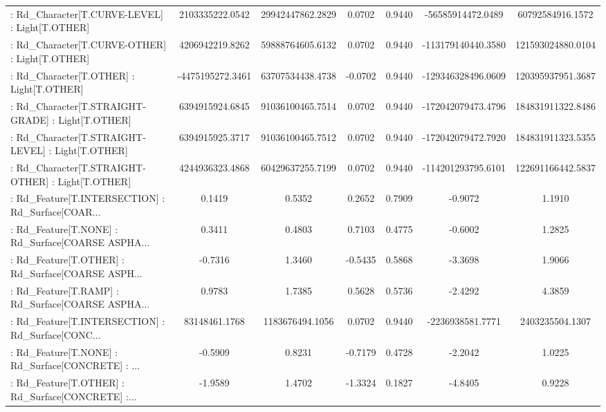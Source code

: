 \begin{longtable}{p{4cm}cccccc}
 : Rd\_Character[T.CURVE-LEVEL] : Light[T.OTHER]    &   2103335222.0542 &  29942447862.2829 &  0.0702 &       0.9440 &  -56585914472.0489 &  60792584916.1572 \\
 : Rd\_Character[T.CURVE-OTHER] : Light[T.OTHER]    &   4206942219.8262 &  59888764605.6132 &  0.0702 &       0.9440 & -113179140440.3580 & 121593024880.0104 \\
 : Rd\_Character[T.OTHER] : Light[T.OTHER]          &  -4475195272.3461 &  63707534438.4738 & -0.0702 &       0.9440 & -129346328496.0609 & 120395937951.3687 \\
 : Rd\_Character[T.STRAIGHT-GRADE] : Light[T.OTHER] &   6394915924.6845 &  91036100465.7514 &  0.0702 &       0.9440 & -172042079473.4796 & 184831911322.8486 \\
 : Rd\_Character[T.STRAIGHT-LEVEL] : Light[T.OTHER] &   6394915925.3717 &  91036100465.7512 &  0.0702 &       0.9440 & -172042079472.7920 & 184831911323.5355 \\
 : Rd\_Character[T.STRAIGHT-OTHER] : Light[T.OTHER] &   4244936323.4868 &  60429637255.7199 &  0.0702 &       0.9440 & -114201293795.6101 & 122691166442.5837 \\
 : Rd\_Feature[T.INTERSECTION] : Rd\_Surface[COAR... &            0.1419 &            0.5352 &  0.2652 &       0.7909 &            -0.9072 &            1.1910 \\
 : Rd\_Feature[T.NONE] : Rd\_Surface[COARSE ASPHA... &            0.3411 &            0.4803 &  0.7103 &       0.4775 &            -0.6002 &            1.2825 \\
 : Rd\_Feature[T.OTHER] : Rd\_Surface[COARSE ASPH... &           -0.7316 &            1.3460 & -0.5435 &       0.5868 &            -3.3698 &            1.9066 \\
 : Rd\_Feature[T.RAMP] : Rd\_Surface[COARSE ASPHA... &            0.9783 &            1.7385 &  0.5628 &       0.5736 &            -2.4292 &            4.3859 \\
 : Rd\_Feature[T.INTERSECTION] : Rd\_Surface[CONC... &     83148461.1768 &   1183676494.1056 &  0.0702 &       0.9440 &   -2236938581.7771 &   2403235504.1307 \\
 : Rd\_Feature[T.NONE] : Rd\_Surface[CONCRETE] : ... &           -0.5909 &            0.8231 & -0.7179 &       0.4728 &            -2.2042 &            1.0225 \\
 : Rd\_Feature[T.OTHER] : Rd\_Surface[CONCRETE] :... &           -1.9589 &            1.4702 & -1.3324 &       0.1827 &            -4.8405 &            0.9228 \\

\end{longtable}
